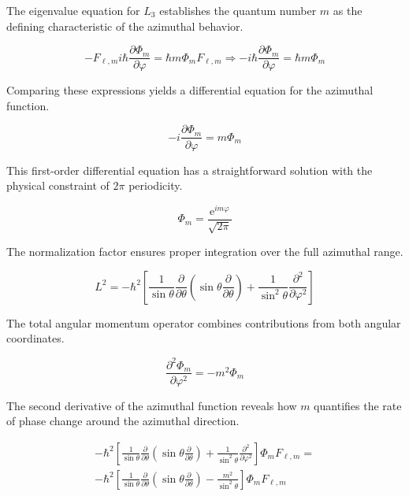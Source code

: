 \documentclass[italian]{HKNdocument}
\begin{document}
The eigenvalue equation for $L_3$ establishes the quantum number $m$ as the defining characteristic of the azimuthal behavior.

\begin{equation}
-F_{\ell, m} i \hbar \frac{\partial \Phi_{m}}{\partial \varphi}=\hbar m \Phi_{m} F_{\ell, m} \Longrightarrow-i \hbar \frac{\partial \Phi_{m}}{\partial \varphi}=\hbar m \Phi_{m}
\end{equation}

Comparing these expressions yields a differential equation for the azimuthal function.

\begin{equation}
-i \frac{\partial \Phi_{m}}{\partial \varphi}=m \Phi_{m}
\end{equation}

This first-order differential equation has a straightforward solution with the physical constraint of $2\pi$ periodicity.

\begin{equation}
\Phi_{m}=\frac{\mathrm{e}^{i m \varphi}}{\sqrt{2 \pi}}
\end{equation}

The normalization factor ensures proper integration over the full azimuthal range.

\begin{equation}
L^{2}=-\hbar^{2}\left[\frac{1}{\sin \theta} \frac{\partial}{\partial \theta}\left(\sin \theta \frac{\partial}{\partial \theta}\right)+\frac{1}{\sin ^{2} \theta} \frac{\partial^{2}}{\partial \varphi^{2}}\right]
\end{equation}

The total angular momentum operator combines contributions from both angular coordinates.

\begin{equation}
\frac{\partial^{2} \Phi_{m}}{\partial \varphi^{2}}=-m^{2} \Phi_{m}
\end{equation}

The second derivative of the azimuthal function reveals how $m$ quantifies the rate of phase change around the azimuthal direction.

\[
\begin{array}{r}
-\hbar^{2}\left[\frac{1}{\sin \theta} \frac{\partial}{\partial \theta}\left(\sin \theta \frac{\partial}{\partial \theta}\right)+\frac{1}{\sin ^{2} \theta} \frac{\partial^{2}}{\partial \varphi^{2}}\right] \Phi_{m} F_{\ell, m}=  \\
-\hbar^{2}\left[\frac{1}{\sin \theta} \frac{\partial}{\partial \theta}\left(\sin \theta \frac{\partial}{\partial \theta}\right)-\frac{m^{2}}{\sin ^{2} \theta}\right] \Phi_{m} F_{\ell, m}
\end{array}
\]
\end{document}

